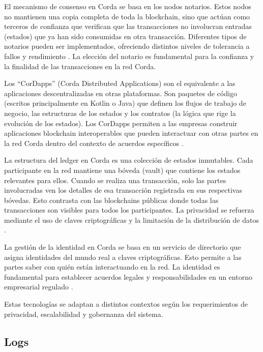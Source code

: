 El mecanismo de consenso en Corda se basa en los nodos notarios. Estos nodos no mantienen una copia completa de toda la blockchain, sino que actúan como terceros de confianza que verifican que las transacciones no involucran entradas (estados) que ya han sido consumidas en otra transacción. Diferentes tipos de notarios pueden ser implementados, ofreciendo distintos niveles de tolerancia a fallos y rendimiento \cite{Brown2018}. La elección del notario es fundamental para la confianza y la finalidad de las transacciones en la red Corda.

Los “CorDapps” (Corda Distributed Applications) son el equivalente a las aplicaciones descentralizadas en otras plataformas. Son paquetes de código (escritos principalmente en Kotlin o Java) que definen los flujos de trabajo de negocio, las estructuras de los estados y los contratos (la lógica que rige la evolución de los estados). Los CorDapps permiten a las empresas construir aplicaciones blockchain interoperables que pueden interactuar con otras partes en la red Corda dentro del contexto de acuerdos específicos \cite{R3CordaDocs}.

La estructura del ledger en Corda es una colección de estados inmutables. Cada participante en la red mantiene una bóveda (vault) que contiene los estados relevantes para ellos. Cuando se realiza una transacción, solo las partes involucradas ven los detalles de esa transacción registrada en sus respectivas bóvedas. Esto contrasta con las blockchains públicas donde todas las transacciones son visibles para todos los participantes. La privacidad se refuerza mediante el uso de claves criptográficas y la limitación de la distribución de datos \cite{R3CordaPrivacy}.

La gestión de la identidad en Corda se basa en un servicio de directorio que asigna identidades del mundo real a claves criptográficas. Esto permite a las partes saber con quién están interactuando en la red. La identidad es fundamental para establecer acuerdos legales y responsabilidades en un entorno empresarial regulado \cite{R3CordaIdentity}.



Estas tecnologías se adaptan a distintos contextos según los requerimientos de privacidad, escalabilidad y gobernanza del sistema.


\subsection{Logs}
